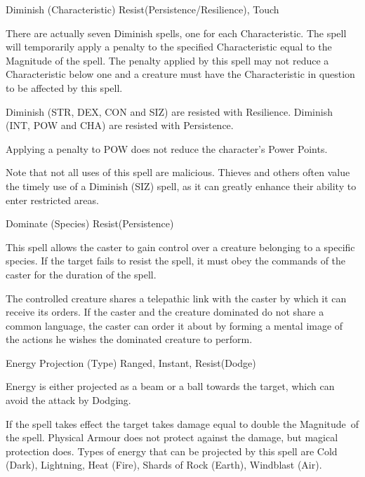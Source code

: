 \begin{rpg-spell}
{Diminish (Characteristic)}
{Resist(Persistence/Resilience), Touch}

There are actually seven Diminish spells, one for each Characteristic. The spell will temporarily apply a penalty to the specified Characteristic equal to the Magnitude of the spell. The penalty applied by this spell may not reduce a Characteristic below one and a creature must have the Characteristic in question to be affected by this spell. 

Diminish (STR, DEX, CON and SIZ) are resisted with Resilience. Diminish (INT, POW and CHA) are resisted with Persistence. 

Applying a penalty to POW does not reduce the character’s Power Points.

Note that not all uses of this spell are malicious. Thieves and others often value the timely use of a Diminish (SIZ) spell, as it can greatly enhance their ability to enter restricted areas. 
\end{rpg-spell}


\begin{rpg-spell}
{Dominate (Species)}
{Resist(Persistence)}

This spell allows the caster to gain control over a creature belonging to a specific species. If the target fails to resist the spell, it must obey the commands of the caster for the duration of the spell. 

The controlled creature shares a telepathic link with the caster by which it can receive its orders. If the caster and the creature dominated do not share a common language, the caster can order it about by forming a mental image of the actions he wishes the dominated creature to perform.
\end{rpg-spell}


\begin{rpg-spell}
{Energy Projection (Type)}
{Ranged, Instant, Resist(Dodge)}

Energy is either projected as a beam or a ball towards the target, which can avoid the attack by Dodging.

If the spell takes effect the target takes damage equal to double the Magnitude of the spell. Physical Armour does not protect against the damage, but magical protection does. Types of energy that can be projected by this spell are Cold (Dark), Lightning, Heat (Fire), Shards of Rock (Earth), Windblast (Air).
\end{rpg-spell}


